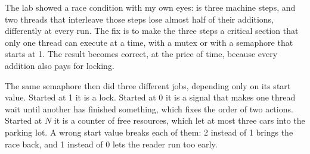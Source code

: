 \documentclass[11pt,a4paper]{article}
\begin{document}

The lab showed a race condition with my own eyes:  is three machine steps, and
two threads that interleave those steps lose almost half of their additions, differently at
every run. The fix is to make the three steps a critical section that only one thread can
execute at a time, with a mutex or with a semaphore that starts at 1. The result becomes
correct, at the price of time, because every addition also pays for locking.

The same semaphore then did three different jobs, depending only on its start value. Started at
1 it is a lock. Started at 0 it is a signal that makes one thread wait until another has
finished something, which fixes the order of two actions. Started at \(N\) it is a counter of
free resources, which let at most three cars into the parking lot. A wrong start value breaks
each of them: 2 instead of 1 brings the race back, and 1 instead of 0 lets the reader run too
early.
\end{document}
